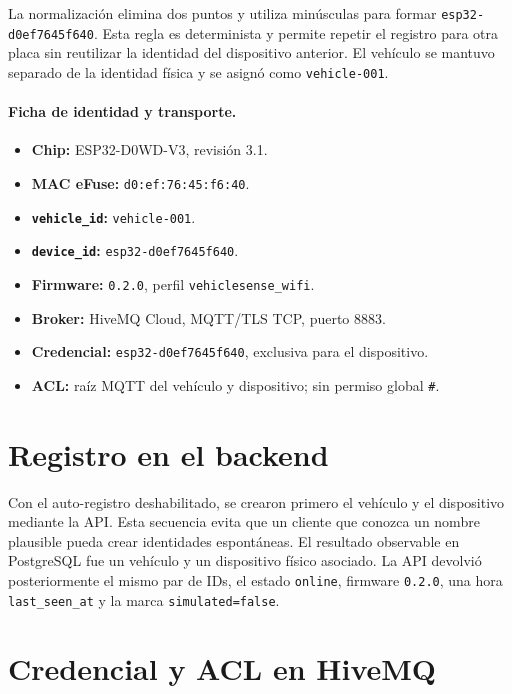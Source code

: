 \documentclass[10pt,a4paper]{article}
\newcommand{\code}[1]{\texttt{\small #1}}
\begin{document}
\begin{center}
\fbox{\Large\code{d0:ef:76:45:f6:40}}
\end{center}

La normalización elimina dos puntos y utiliza minúsculas para formar
\code{esp32-d0ef7645f640}. Esta regla es determinista y permite repetir el
registro para otra placa sin reutilizar la identidad del dispositivo anterior.
El vehículo se mantuvo separado de la identidad física y se asignó como
\code{vehicle-001}.

\paragraph{Ficha de identidad y transporte.}
\begin{itemize}[leftmargin=0pt,label={}]
  \item \textbf{Chip:} ESP32-D0WD-V3, revisión 3.1.
  \item \textbf{MAC eFuse:} \code{d0:ef:76:45:f6:40}.
  \item \textbf{\code{vehicle\_id}:} \code{vehicle-001}.
  \item \textbf{\code{device\_id}:} \code{esp32-d0ef7645f640}.
  \item \textbf{Firmware:} \code{0.2.0}, perfil \code{vehiclesense\_wifi}.
  \item \textbf{Broker:} HiveMQ Cloud, MQTT/TLS TCP, puerto 8883.
  \item \textbf{Credencial:} \code{esp32-d0ef7645f640}, exclusiva para el dispositivo.
  \item \textbf{ACL:} raíz MQTT del vehículo y dispositivo; sin permiso global \code{\#}.
\end{itemize}

\section{Registro en el backend}

Con el auto-registro deshabilitado, se crearon primero el vehículo y el
dispositivo mediante la API. Esta secuencia evita que un cliente que conozca un
nombre plausible pueda crear identidades espontáneas. El resultado observable
en PostgreSQL fue un vehículo y un dispositivo físico asociado. La API devolvió
posteriormente el mismo par de IDs, el estado \code{online}, firmware
\code{0.2.0}, una hora \code{last\_seen\_at} y la marca \code{simulated=false}.

\section{Credencial y ACL en HiveMQ}
\end{document}
